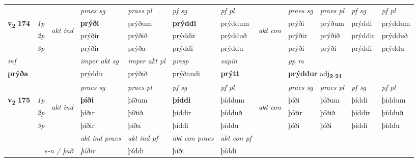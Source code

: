 \begin{longtable}[l]{X>{\footnotesize\itshape}llXXXXlXXXX}
 & &   & \textit{praes sg}  & \textit{praes pl}    & \textit{ pf sg} & \textit{pf pl} & & \textit{praes sg}  & \textit{praes pl}    & \textit{pf sg} & \textit{pf pl }  \\ \cmidrule{4-7} \cmidrule{9-12}
 \multirow{2}{*}{{{\textbf{v{\textsubscript{2}}} \Large{\textbf{174}}}}}  & 1p & \multirow{3}{*}{\begin{turn}{90}\textit{akt ind}\end{turn}} & \textbf{prýði} & prýðum & \textbf{prýddi} & prýddum & \multirow{3}{*}{\begin{turn}{90}\textit{akt con}\end{turn}} &prýði & prýðum & prýddi & prýddum\\*
 & 2p &  &  prýðir  & prýðið & prýddir & prýdduð & & prýðir & prýðið & prýddir & prýdduð \\*
 & 3p &  & prýðir & prýða & prýddi & prýddu & & prýði & prýði& prýddi & prýddu \\*
\cmidrule{4-7} \cmidrule{9-12}

   {\textit{inf}} & &  & \textit{imper akt sg} & \textit{imper akt pl}   & \textit{presp} & \textit{supin}  && \textit{pp m} \\*
  {\textbf{prýða}} & && prýddu  & prýðið   & prýðandi &  \textbf{prýtt}  && \multicolumn{2}{l}{\textbf{prýddur} adj\textbf{\textsubscript{2-21}}} \\*

\midrule

 & &   & \textit{praes sg}  & \textit{praes pl}    & \textit{ pf sg} & \textit{pf pl} & & \textit{praes sg}  & \textit{praes pl}    & \textit{pf sg} & \textit{pf pl }  \\ \cmidrule{4-7} \cmidrule{9-12}
 \multirow{2}{*}{{{\textbf{v{\textsubscript{2}}} \Large{\textbf{175}}}}}  & 1p & \multirow{3}{*}{\begin{turn}{90}\textit{akt ind}\end{turn}} & \textbf{þíði} & þíðum & \textbf{þíddi} & þíddum & \multirow{3}{*}{\begin{turn}{90}\textit{akt con}\end{turn}} &þíði & þíðum & þíddi & þíddum\\*
 & 2p &  &  þíðir  & þíðið & þíddir & þídduð & & þíðir & þíðið & þíddir & þídduð \\*
 & 3p &  & þíðir & þíða & þíddi & þíddu & & þíði & þíði& þíddi & þíddu \\*
\cmidrule{4-7} \cmidrule{9-12}

   && &  \textit{akt ind praes} & \textit{akt ind pf} & \textit{akt con praes} & \textit{akt con pf} \\*
\multicolumn{3}{r}{\textit{e-n / það}} & þíðir & þíddi & þíði & þíddi \\*


\end{longtable}
